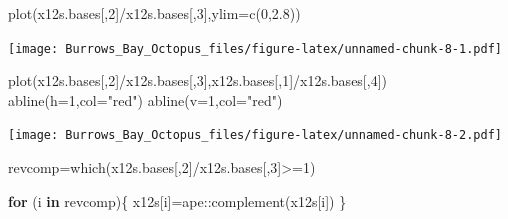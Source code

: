 \documentclass[
]{article}
\newenvironment{Shaded}{\begin{snugshade}}{\end{snugshade}}
\newcommand{\AttributeTok}[1]{\textcolor[rgb]{0.77,0.63,0.00}{#1}}
\newcommand{\ControlFlowTok}[1]{\textcolor[rgb]{0.13,0.29,0.53}{\textbf{#1}}}
\newcommand{\DecValTok}[1]{\textcolor[rgb]{0.00,0.00,0.81}{#1}}
\newcommand{\FloatTok}[1]{\textcolor[rgb]{0.00,0.00,0.81}{#1}}
\newcommand{\FunctionTok}[1]{\textcolor[rgb]{0.00,0.00,0.00}{#1}}
\newcommand{\NormalTok}[1]{#1}
\newcommand{\OtherTok}[1]{\textcolor[rgb]{0.56,0.35,0.01}{#1}}
\newcommand{\SpecialCharTok}[1]{\textcolor[rgb]{0.00,0.00,0.00}{#1}}
\newcommand{\StringTok}[1]{\textcolor[rgb]{0.31,0.60,0.02}{#1}}
\begin{document}
\begin{Shaded}
\begin{Highlighting}[]
\FunctionTok{plot}\NormalTok{(x12s.bases[,}\DecValTok{2}\NormalTok{]}\SpecialCharTok{/}\NormalTok{x12s.bases[,}\DecValTok{3}\NormalTok{],}\AttributeTok{ylim=}\FunctionTok{c}\NormalTok{(}\DecValTok{0}\NormalTok{,}\FloatTok{2.8}\NormalTok{))}
\end{Highlighting}
\end{Shaded}

\texttt{[image: Burrows\_Bay\_Octopus\_files/figure-latex/unnamed-chunk-8-1.pdf]}

\begin{Shaded}
\begin{Highlighting}[]
\FunctionTok{plot}\NormalTok{(x12s.bases[,}\DecValTok{2}\NormalTok{]}\SpecialCharTok{/}\NormalTok{x12s.bases[,}\DecValTok{3}\NormalTok{],x12s.bases[,}\DecValTok{1}\NormalTok{]}\SpecialCharTok{/}\NormalTok{x12s.bases[,}\DecValTok{4}\NormalTok{])}
\FunctionTok{abline}\NormalTok{(}\AttributeTok{h=}\DecValTok{1}\NormalTok{,}\AttributeTok{col=}\StringTok{"red"}\NormalTok{)}
\FunctionTok{abline}\NormalTok{(}\AttributeTok{v=}\DecValTok{1}\NormalTok{,}\AttributeTok{col=}\StringTok{"red"}\NormalTok{)}
\end{Highlighting}
\end{Shaded}

\texttt{[image: Burrows\_Bay\_Octopus\_files/figure-latex/unnamed-chunk-8-2.pdf]}

\begin{Shaded}
\begin{Highlighting}[]
\NormalTok{revcomp}\OtherTok{=}\FunctionTok{which}\NormalTok{(x12s.bases[,}\DecValTok{2}\NormalTok{]}\SpecialCharTok{/}\NormalTok{x12s.bases[,}\DecValTok{3}\NormalTok{]}\SpecialCharTok{\textgreater{}=}\DecValTok{1}\NormalTok{)}
\end{Highlighting}
\end{Shaded}

\begin{Shaded}
\begin{Highlighting}[]
\ControlFlowTok{for}\NormalTok{ (i }\ControlFlowTok{in}\NormalTok{ revcomp)\{}
\NormalTok{  x12s[i]}\OtherTok{=}\NormalTok{ape}\SpecialCharTok{::}\FunctionTok{complement}\NormalTok{(x12s[i])}
\NormalTok{\}}
\end{Highlighting}
\end{Shaded}
\end{document}
